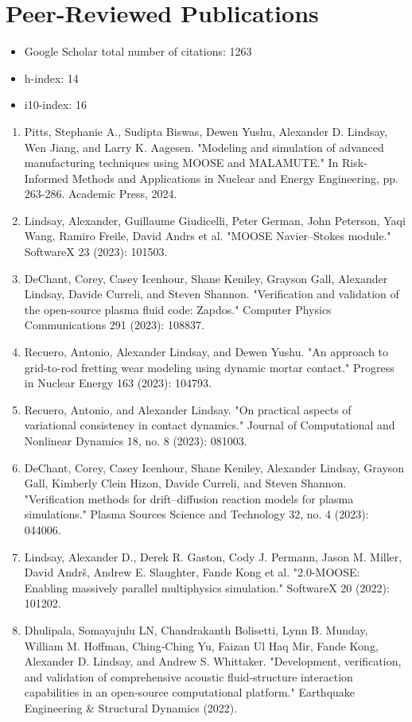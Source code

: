 \section{Peer-Reviewed Publications}
\begin{itemize}
\item Google Scholar total number of citations: 1263
\item h-index: 14
\item i10-index: 16
\end{itemize}

\begin{enumerate}
  \item Pitts, Stephanie A., Sudipta Biswas, Dewen Yushu, Alexander D. Lindsay, Wen Jiang, and Larry K. Aagesen. "Modeling and simulation of advanced manufacturing techniques using MOOSE and MALAMUTE." In Risk-Informed Methods and Applications in Nuclear and Energy Engineering, pp. 263-286. Academic Press, 2024.
  \item Lindsay, Alexander, Guillaume Giudicelli, Peter German, John Peterson, Yaqi Wang, Ramiro Freile, David Andrs et al. "MOOSE Navier–Stokes module." SoftwareX 23 (2023): 101503.
  \item DeChant, Corey, Casey Icenhour, Shane Keniley, Grayson Gall, Alexander Lindsay, Davide Curreli, and Steven Shannon. "Verification and validation of the open-source plasma fluid code: Zapdos." Computer Physics Communications 291 (2023): 108837.
  \item Recuero, Antonio, Alexander Lindsay, and Dewen Yushu. "An approach to grid-to-rod fretting wear modeling using dynamic mortar contact." Progress in Nuclear Energy 163 (2023): 104793.
  \item Recuero, Antonio, and Alexander Lindsay. "On practical aspects of variational consistency in contact dynamics." Journal of Computational and Nonlinear Dynamics 18, no. 8 (2023): 081003.
  \item DeChant, Corey, Casey Icenhour, Shane Keniley, Alexander Lindsay, Grayson Gall, Kimberly Clein Hizon, Davide Curreli, and Steven Shannon. "Verification methods for drift–diffusion reaction models for plasma simulations." Plasma Sources Science and Technology 32, no. 4 (2023): 044006.
  \item Lindsay, Alexander D., Derek R. Gaston, Cody J. Permann, Jason M. Miller, David Andrš, Andrew E. Slaughter, Fande Kong et al. "2.0-MOOSE: Enabling massively parallel multiphysics simulation." SoftwareX 20 (2022): 101202.
  \item Dhulipala, Somayajulu LN, Chandrakanth Bolisetti, Lynn B. Munday, William M. Hoffman, Ching‐Ching Yu, Faizan Ul Haq Mir, Fande Kong, Alexander D. Lindsay, and Andrew S. Whittaker. "Development, verification, and validation of comprehensive acoustic fluid‐structure interaction capabilities in an open‐source computational platform." Earthquake Engineering \& Structural Dynamics (2022).

\end{enumerate}
